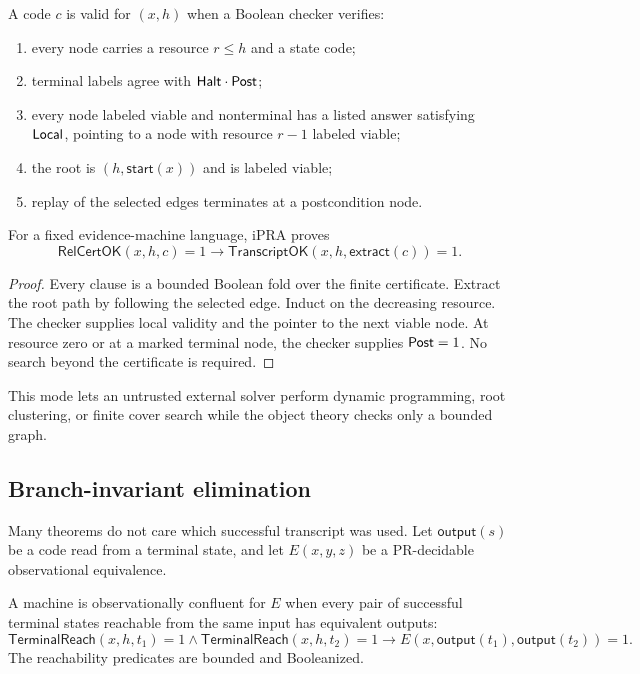 \begin{definition}
A code $c$ is valid for $(x,h)$ when a Boolean checker verifies:
\begin{enumerate}[label=(\alph*)]
\item every node carries a resource $r\le h$ and a state code;
\item terminal labels agree with $\mathsf{Halt}\cdot\mathsf{Post}$;
\item every node labeled viable and nonterminal has a listed answer satisfying $\mathsf{Local}$, pointing to a node with resource $r-1$ labeled viable;
\item the root is $(h,\mathsf{start}(x))$ and is labeled viable;
\item replay of the selected edges terminates at a postcondition node.
\end{enumerate}
\end{definition}

\begin{proposition}
\label{prop:rel-cert}
For a fixed evidence-machine language, iPRA proves
\[
 \mathsf{RelCertOK}(x,h,c)=1\to
 \mathsf{TranscriptOK}(x,h,\mathsf{extract}(c))=1.
\]
\end{proposition}

\begin{proof}
Every clause is a bounded Boolean fold over the finite certificate.  Extract the root path by following the selected edge.  Induct on the decreasing resource.  The checker supplies local validity and the pointer to the next viable node.  At resource zero or at a marked terminal node, the checker supplies $\mathsf{Post}=1$.  No search beyond the certificate is required.
\end{proof}

This mode lets an untrusted external solver perform dynamic programming, root clustering, or finite cover search while the object theory checks only a bounded graph.

\subsection{Branch-invariant elimination}

Many theorems do not care which successful transcript was used.  Let $\mathsf{output}(s)$ be a code read from a terminal state, and let $E(x,y,z)$ be a PR-decidable observational equivalence.

\begin{definition}
A machine is observationally confluent for $E$ when every pair of successful terminal states reachable from the same input has equivalent outputs:
\[
 \mathsf{TerminalReach}(x,h,t_1)=1\wedge
 \mathsf{TerminalReach}(x,h,t_2)=1
 \to E(x,\mathsf{output}(t_1),\mathsf{output}(t_2))=1.
\]
The reachability predicates are bounded and Booleanized.
\end{definition}

